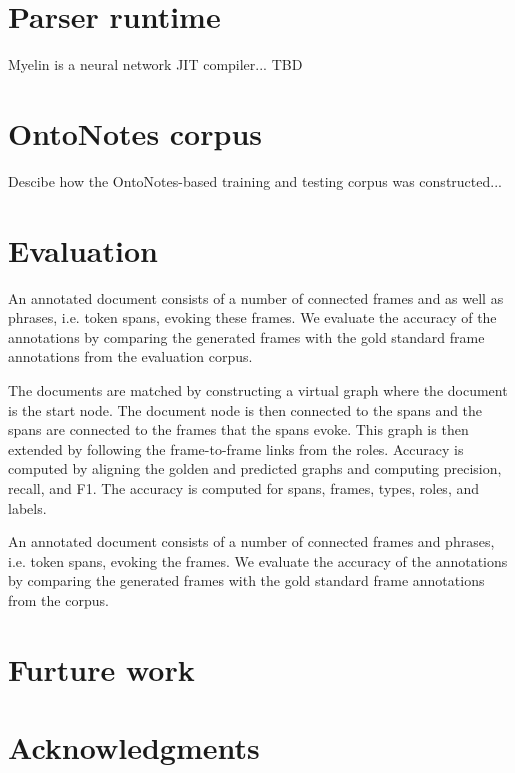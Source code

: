 \documentclass[11pt,a4paper]{article}
\begin{document}
\section{Parser runtime}

Myelin is a neural network JIT compiler... TBD

\section{OntoNotes corpus}

Descibe how the OntoNotes-based training and testing corpus was constructed...

\section{Evaluation}

An annotated document consists of a number of connected frames and as well as
phrases, i.e. token spans, evoking these frames. We evaluate the accuracy of the
annotations by comparing the generated frames with the gold standard frame
annotations from the evaluation corpus.

The documents are matched by constructing a virtual graph where the document
is the start node. The document node is then connected to the spans and the
spans are connected to the frames that the spans evoke. This graph is then
extended by following the frame-to-frame links from the roles. Accuracy is
computed by aligning the golden and predicted graphs and computing precision,
recall, and F1. The accuracy is computed for spans, frames, types, roles, and
labels.

An annotated document consists of a number of connected frames and phrases, i.e.
token spans, evoking the frames. We evaluate the accuracy of the annotations
by comparing the generated frames with the gold standard frame annotations from
the corpus.

\section{Furture work}



\section{Acknowledgments}



\end{document}
